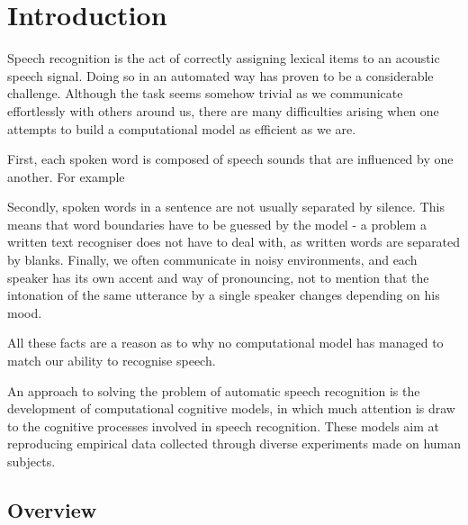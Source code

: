 
\chapter{Introduction}

Speech recognition is the act of correctly assigning lexical items to an acoustic speech signal.
Doing so in an automated way has proven to be a considerable challenge. Although the task seems somehow trivial as we communicate effortlessly with others around us, there are many difficulties arising when one attempts to build a computational model as efficient as we are.

First, each spoken word is composed of speech sounds that are influenced by one another. 
For example

Secondly, spoken words in a sentence are not usually separated by silence. This means that word boundaries have to be guessed by the model - a problem a written text recogniser does not have to deal with, as written words are separated by blanks.
Finally, we often communicate in noisy environments, and each speaker has its own accent and way of pronouncing, not to mention that the intonation of the same utterance by a single speaker changes depending on his mood.

All these facts are a reason as to why no computational model has managed to match our ability to recognise speech. 


An approach to solving the problem of automatic speech recognition is the development of computational cognitive models, in which much attention is draw to the cognitive processes involved in speech recognition. These models aim at reproducing empirical data collected through diverse experiments made on human subjects. 





\section{Overview}

